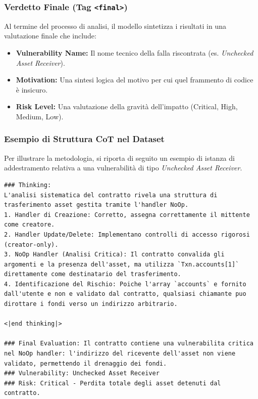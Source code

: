 \subsubsection{Verdetto Finale (Tag \texttt{<final>})}
Al termine del processo di analisi, il modello sintetizza i risultati in una valutazione finale che include:
\begin{itemize}
    \item \textbf{Vulnerability Name:} Il nome tecnico della falla riscontrata (es. \textit{Unchecked Asset Receiver}).
    \item \textbf{Motivation:} Una sintesi logica del motivo per cui quel frammento di codice è insicuro.
    \item \textbf{Risk Level:} Una valutazione della gravità dell'impatto (Critical, High, Medium, Low).
\end{itemize}

\subsubsection{Esempio di Struttura CoT nel Dataset}
Per illustrare la metodologia, si riporta di seguito un esempio di istanza di addestramento relativa a una vulnerabilità di tipo \textit{Unchecked Asset Receiver}.

\begin{lstlisting}[caption={Esempio di ragionamento CoT per l'analisi di un contratto PyTeal}, label={lst:cot_example}]
### Thinking:
L'analisi sistematica del contratto rivela una struttura di trasferimento asset gestita tramite l'handler NoOp. 
1. Handler di Creazione: Corretto, assegna correttamente il mittente come creatore.
2. Handler Update/Delete: Implementano controlli di accesso rigorosi (creator-only).
3. NoOp Handler (Analisi Critica): Il contratto convalida gli argomenti e la presenza dell'asset, ma utilizza `Txn.accounts[1]` direttamente come destinatario del trasferimento.
4. Identificazione del Rischio: Poiche l'array `accounts` e fornito dall'utente e non e validato dal contratto, qualsiasi chiamante puo dirottare i fondi verso un indirizzo arbitrario.

<|end thinking|>

### Final Evaluation: Il contratto contiene una vulnerabilita critica nel NoOp handler: l'indirizzo del ricevente dell'asset non viene validato, permettendo il drenaggio dei fondi.
### Vulnerability: Unchecked Asset Receiver
### Risk: Critical - Perdita totale degli asset detenuti dal contratto.
\end{lstlisting}

